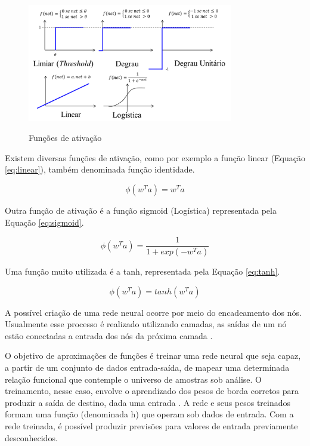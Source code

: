 \begin{figure}[h]
    \caption{Funções de ativação}
    \centering
    \includegraphics[width=0.8\textwidth]{Textuais/Figuras/funcao-ativacao.png}
    \label{fig:neuronio-rna}
\end{figure}

Existem diversas funções de ativação, como por exemplo a função linear (Equação \ref{eq:linear}), também denominada função identidade.

\begin{equation}
\label{eq:linear}
    \phi(w^Ta) =w^Ta
\end{equation}

Outra função de ativação é a função sigmoid (Logística) representada pela Equação \ref{eq:sigmoid}.

\begin{equation}
\label{eq:sigmoid}
    \phi(w^Ta)=\frac{1}{1+exp(-w^Ta)} 
\end{equation}

Uma função muito utilizada é a tanh, representada pela Equação \ref{eq:tanh}.

\begin{equation}
\label{eq:tanh}
    \phi(w^Ta) = tanh(w^Ta)
\end{equation}

A possível criação de uma rede neural ocorre por meio do encadeamento dos nós. Usualmente esse processo é realizado utilizando camadas, as saídas de um nó estão conectadas a entrada dos nós da próxima camada \cite{tensor-flow}.

O objetivo de aproximações de funções é treinar uma rede neural que seja capaz, a partir de um conjunto de dados entrada-saída, de mapear uma determinada relação funcional que contemple o universo de amostras sob análise. O treinamento, nesse caso, envolve o aprendizado dos pesos de borda corretos para produzir a saída de destino, dada uma entrada \cite{uml}. A rede e seus pesos treinados formam uma função (denominada h) que operam sob dados de entrada. Com a rede treinada, é possível produzir previsões para valores de entrada previamente desconhecidos.

